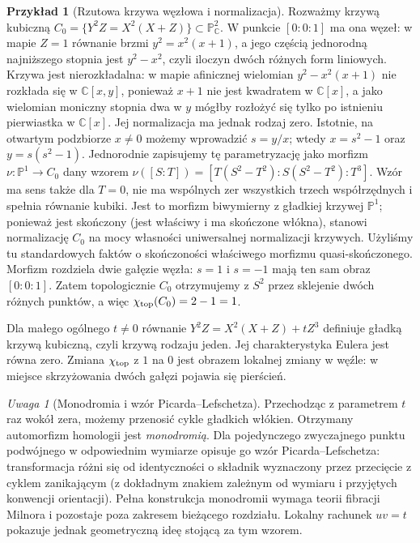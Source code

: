 \documentclass[11pt,a4paper,openany]{report}
\numberwithin{equation}{section}
\theoremstyle{plain}
\theoremstyle{definition}
\newtheorem{przyklad}[twierdzenie]{Przykład}
\theoremstyle{remark}
\newtheorem{uwaga}[twierdzenie]{Uwaga}
\newcommand{\C}{\mathbb C}
\newcommand{\PP}{\mathbb P}
\begin{document}
\begin{przyklad}[Rzutowa krzywa węzłowa i normalizacja]
Rozważmy krzywą kubiczną
$C_0=\{Y^2Z=X^2(X+Z)\}\subset\PP^2_\C$.
W punkcie $[0:0:1]$ ma ona węzeł: w mapie $Z=1$
równanie brzmi $y^2=x^2(x+1)$, a jego częścią
jednorodną najniższego stopnia jest $y^2-x^2$,
czyli iloczyn dwóch różnych form liniowych.
Krzywa jest nierozkładalna: w mapie afinicznej wielomian
$y^2-x^2(x+1)$ nie rozkłada się w $\C[x,y]$, ponieważ
$x+1$ nie jest kwadratem w $\C[x]$, a jako wielomian
moniczny stopnia dwa w $y$ mógłby rozłożyć się tylko
po istnieniu pierwiastka w $\C[x]$.
Jej normalizacja ma jednak rodzaj zero. Istotnie, na otwartym podzbiorze
$x\ne0$ możemy wprowadzić $s=y/x$; wtedy
$x=s^2-1$ oraz $y=s(s^2-1)$.
Jednorodnie zapisujemy tę parametryzację jako morfizm
$\nu\colon\PP^1\to C_0$ dany wzorem
$\nu([S:T])=[T(S^2-T^2):S(S^2-T^2):T^3]$.
Wzór ma sens także dla $T=0$, nie ma wspólnych zer wszystkich
trzech współrzędnych i spełnia równanie kubiki.
Jest to morfizm biwymierny z gładkiej krzywej $\PP^1$;
ponieważ jest skończony (jest właściwy i ma skończone włókna),
stanowi normalizację $C_0$ na mocy własności uniwersalnej
normalizacji krzywych. Użyliśmy tu standardowych faktów
o skończoności właściwego morfizmu quasi-skończonego.
Morfizm rozdziela dwie gałęzie węzła:
$s=1$ i $s=-1$ mają ten sam obraz $[0:0:1]$.
Zatem topologicznie $C_0$ otrzymujemy z $S^2$
przez sklejenie dwóch różnych punktów, a więc
$\chi_{\rm top}(C_0)=2-1=1$.

Dla małego ogólnego $t\ne0$ równanie
$Y^2Z=X^2(X+Z)+tZ^3$ definiuje gładką
krzywą kubiczną, czyli krzywą rodzaju jeden.
Jej charakterystyka Eulera jest równa zero.
Zmiana $\chi_{\rm top}$ z $1$ na $0$ jest
obrazem lokalnej zmiany w węźle: w miejsce
skrzyżowania dwóch gałęzi pojawia się pierścień.
\end{przyklad}

\begin{uwaga}[Monodromia i wzór Picarda--Lefschetza]
Przechodząc z parametrem $t$ raz wokół zera,
możemy przenosić cykle gładkich włókien.
Otrzymany automorfizm homologii jest \emph{monodromią}.
Dla pojedynczego zwyczajnego punktu podwójnego
w odpowiednim wymiarze opisuje go wzór Picarda--Lefschetza:
transformacja różni się od identyczności o składnik
wyznaczony przez przecięcie z cyklem zanikającym
(z dokładnym znakiem zależnym od wymiaru i przyjętych
konwencji orientacji). Pełna konstrukcja monodromii
wymaga teorii fibracji Milnora i pozostaje poza
zakresem bieżącego rozdziału. Lokalny rachunek $uv=t$
pokazuje jednak geometryczną ideę stojącą za tym wzorem.
\end{uwaga}
\end{document}

